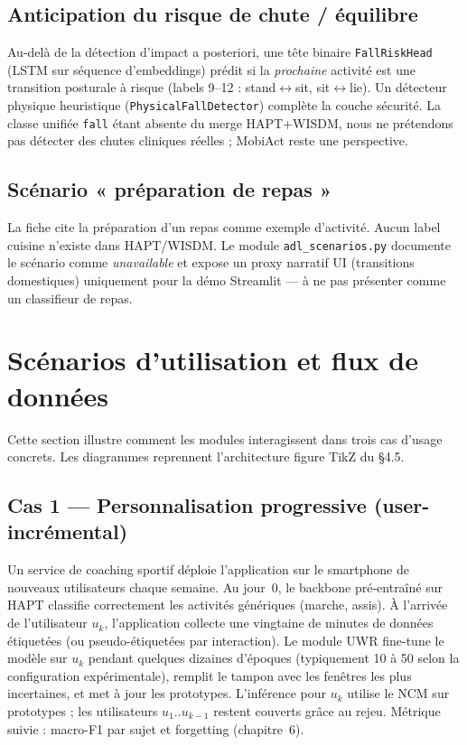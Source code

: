 \documentclass[a4paper,12pt]{report}
\begin{document}
\subsection{Anticipation du risque de chute / équilibre}

Au-delà de la détection d'impact a posteriori, une tête binaire
\texttt{FallRiskHead} (LSTM sur séquence d'embeddings) prédit si la
\emph{prochaine} activité est une transition posturale à risque
(labels 9--12 : stand$\leftrightarrow$sit, sit$\leftrightarrow$lie). Un
détecteur physique heuristique (\texttt{PhysicalFallDetector}) complète la
couche sécurité. La classe unifiée \texttt{fall} étant absente du merge
HAPT+WISDM, nous ne prétendons pas détecter des chutes cliniques réelles ;
MobiAct reste une perspective.

\subsection{Scénario « préparation de repas »}

La fiche cite la préparation d'un repas comme exemple d'activité. Aucun
label cuisine n'existe dans HAPT/WISDM. Le module
\texttt{adl\_scenarios.py} documente le scénario comme \emph{unavailable}
et expose un proxy narratif UI (transitions domestiques) uniquement pour
la démo Streamlit — à ne pas présenter comme un classifieur de repas.

\section{Scénarios d'utilisation et flux de données}

Cette section illustre comment les modules interagissent dans trois cas d'usage
concrets. Les diagrammes reprennent l'architecture figure TikZ du §4.5.

\subsection{Cas 1 — Personnalisation progressive (user-incrémental)}

Un service de coaching sportif déploie l'application sur le smartphone de nouveaux
utilisateurs chaque semaine. Au jour~0, le backbone pré-entraîné sur HAPT classifie
correctement les activités génériques (marche, assis). À l'arrivée de l'utilisateur
$u_k$, l'application collecte une vingtaine de minutes de données étiquetées (ou
pseudo-étiquetées par interaction). Le module UWR fine-tune le modèle sur $u_k$
pendant quelques dizaines d'époques (typiquement 10 à 50 selon la configuration
expérimentale), remplit le tampon avec les fenêtres les plus incertaines, et
met à jour les prototypes. L'inférence pour $u_k$ utilise le NCM sur prototypes ;
les utilisateurs $u_1..u_{k-1}$ restent couverts grâce au rejeu. Métrique suivie :
macro-F1 par sujet et forgetting (chapitre~6).
\end{document}
